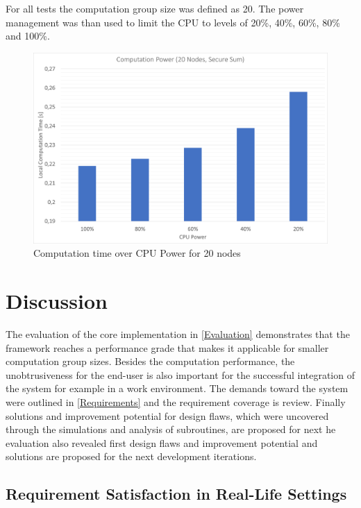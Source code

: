 For all tests the computation group size was defined as 20. The power management was than used to limit the CPU to levels of 20\%, 40\%, 60\%, 80\% and 100\%.
\begin{figure}[!htbp] %
	\caption{Computation time over CPU Power for 20 nodes} \label{figure:Computation time over CPU Power for 20 nodes}
	\includegraphics[scale=1.0]{figures/eval_power.png}
\end{figure}

\FloatBarrier

\chapter{Discussion} \label{Discussion}

The evaluation of the core implementation in \autoref{Evaluation} demonstrates that the framework reaches a performance grade that makes it applicable for smaller computation group sizes. Besides the computation performance, the unobtrusiveness for the end-user is also important for the successful integration of the system for example in a work environment. The demands toward the system were outlined in \autoref{Requirements} and the requirement coverage is review.
Finally solutions and improvement potential for design flaws, which were uncovered through the simulations and analysis of subroutines, are proposed for next  he evaluation also revealed first design flaws and improvement potential and solutions are proposed for the next development iterations.

\section{Requirement Satisfaction in Real-Life Settings} \label{Requirement Satisfaction in Real-Life Settings}

